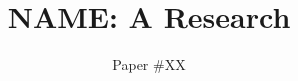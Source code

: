 \documentclass[letterpaper,twocolumn,10pt]{article}
\newcommand{\name}{NAME\xspace}
\begin{document}

\date{}

\title{\Large \bf \name: A Research}

\author{
{\rm Paper \#XX}\\
} %

\maketitle

\begin{abstract}

\end{abstract}










\end{document}
